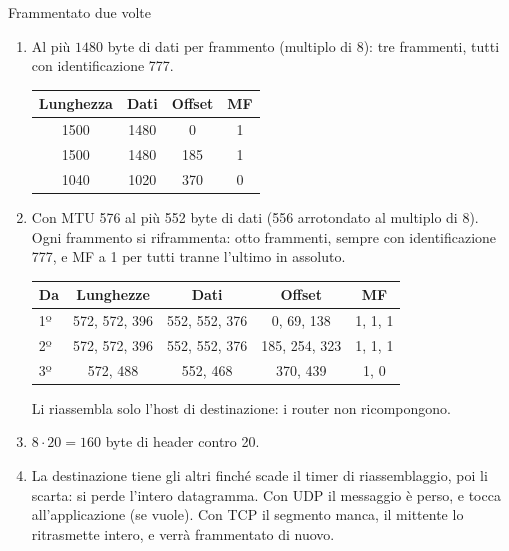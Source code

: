 \begin{esercizio}{Frammentato due volte}
\svolgimento
\begin{enumerate}[label=(\alph*)]
    \item Al più $1480$ byte di dati per frammento (multiplo di 8): tre frammenti, tutti con identificazione 777.
          \begin{center}
          \small
          \begin{tabular}{cccc}
          \toprule
          \textbf{Lunghezza} & \textbf{Dati} & \textbf{Offset} & \textbf{MF} \\
          \midrule
          1500 & 1480 & 0 & 1 \\
          1500 & 1480 & 185 & 1 \\
          1040 & 1020 & 370 & 0 \\
          \bottomrule
          \end{tabular}
          \end{center}
    \item Con MTU 576 al più 552 byte di dati (556 arrotondato al multiplo di 8). Ogni frammento si riframmenta: otto frammenti, sempre con
          identificazione 777, e MF a 1 per tutti tranne l'ultimo in assoluto.
          \begin{center}
          \small
          \begin{tabular}{lcccc}
          \toprule
          \textbf{Da} & \textbf{Lunghezze} & \textbf{Dati} & \textbf{Offset} & \textbf{MF} \\
          \midrule
          1º & 572, 572, 396 & 552, 552, 376 & 0, 69, 138 & 1, 1, 1 \\
          2º & 572, 572, 396 & 552, 552, 376 & 185, 254, 323 & 1, 1, 1 \\
          3º & 572, 488 & 552, 468 & 370, 439 & 1, 0 \\
          \bottomrule
          \end{tabular}
          \end{center}
          Li riassembla solo l'host di destinazione: i router non ricompongono.
    \item $8 \cdot 20 = 160$ byte di header contro 20.
    \item La destinazione tiene gli altri finché scade il timer di riassemblaggio, poi li scarta: si perde l'intero datagramma. Con UDP il
          messaggio è perso, e tocca all'applicazione (se vuole). Con TCP il segmento manca, il mittente lo ritrasmette intero, e verrà
          frammentato di nuovo.
\end{enumerate}
\end{esercizio}

